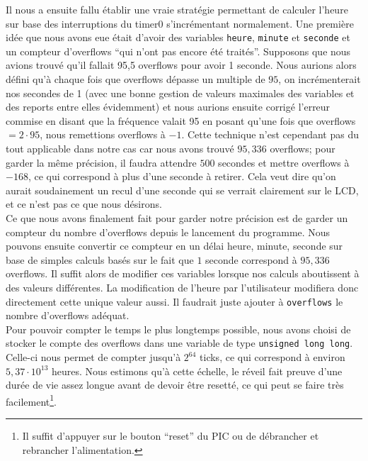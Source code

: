 \documentclass[12pt,a4paper]{article}
\begin{document}
    Il nous a ensuite fallu établir une vraie stratégie permettant de calculer l'heure sur base des interruptions du timer0 s'incrémentant normalement. Une première idée que nous avons eue était d'avoir des variables \texttt{heure}, \texttt{minute} et \texttt{seconde} et un compteur d'overflows ``qui n'ont pas encore été traités''. Supposons que nous avions trouvé qu'il fallait 95,5 overflows pour avoir 1 seconde.
    Nous aurions alors défini qu'à chaque fois que overflows dépasse un multiple de $95$, on incrémenterait nos secondes de 1 (avec une bonne gestion de valeurs maximales des variables et des reports entre elles évidemment) et nous aurions ensuite corrigé l'erreur commise en disant que la fréquence valait 95 en posant qu'une fois que overflows $= 2\cdot 95$, nous remettions overflows à $-1$. Cette technique n'est cependant pas du tout applicable dans notre cas car nous avons trouvé $95,336$ overflows; pour garder la même précision, il faudra attendre $500$ secondes et mettre overflows à $-168$, ce qui correspond à plus d'une seconde à retirer. Cela veut dire qu'on aurait soudainement un recul d'une seconde qui se verrait clairement sur le LCD, et ce n'est pas ce que nous désirons.\\
    
    Ce que nous avons finalement fait pour garder notre précision est de garder un compteur du nombre d'overflows depuis le lancement du programme. Nous pouvons ensuite convertir ce compteur en un délai heure, minute, seconde sur base de simples calculs basés sur le fait que $1$ seconde correspond à $95,336$ overflows. Il suffit alors de modifier ces variables lorsque nos calculs aboutissent à des valeurs différentes. La modification de l'heure par l'utilisateur modifiera donc directement cette unique valeur aussi. Il faudrait juste ajouter à \texttt{overflows} le nombre d'overflows adéquat.\\
    
    Pour pouvoir compter le temps le plus longtemps possible, nous avons choisi de stocker le compte des overflows dans une variable de type \texttt{unsigned long long}. Celle-ci nous permet de compter jusqu'à $2^{64}$ ticks, ce qui correspond à environ $5,37 \cdot 10^{13}$ heures. Nous estimons qu'à cette échelle, le réveil fait preuve d'une durée de vie assez longue avant de devoir être resetté, ce qui peut se faire très facilement\footnote{Il suffit d'appuyer sur le bouton ``reset'' du PIC ou de débrancher et rebrancher l'alimentation.}.
\end{document}
